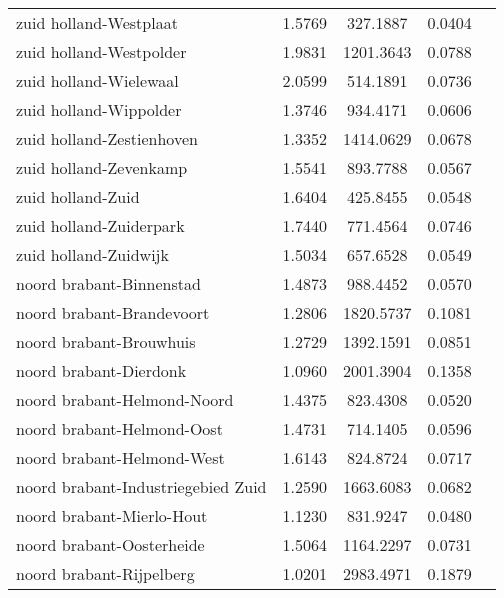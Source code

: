 \begin{longtable}{llccc}
	zuid holland-Westplaat                    & 1.5769  & 327.1887  & 0.0404                 \\
	zuid holland-Westpolder                   & 1.9831  & 1201.3643 & 0.0788                 \\
	zuid holland-Wielewaal                    & 2.0599  & 514.1891  & 0.0736                 \\
	zuid holland-Wippolder                    & 1.3746  & 934.4171  & 0.0606                 \\
	zuid holland-Zestienhoven                 & 1.3352  & 1414.0629 & 0.0678                 \\
	zuid holland-Zevenkamp                    & 1.5541  & 893.7788  & 0.0567                 \\
	zuid holland-Zuid                         & 1.6404  & 425.8455  & 0.0548                 \\
	zuid holland-Zuiderpark                   & 1.7440  & 771.4564  & 0.0746                 \\
	zuid holland-Zuidwijk                     & 1.5034  & 657.6528  & 0.0549                 \\
	noord brabant-Binnenstad                  & 1.4873  & 988.4452  & 0.0570                 \\
	noord brabant-Brandevoort                 & 1.2806  & 1820.5737 & 0.1081                 \\
	noord brabant-Brouwhuis                   & 1.2729  & 1392.1591 & 0.0851                 \\
	noord brabant-Dierdonk                    & 1.0960  & 2001.3904 & 0.1358                 \\
	noord brabant-Helmond-Noord               & 1.4375  & 823.4308  & 0.0520                 \\
	noord brabant-Helmond-Oost                & 1.4731  & 714.1405  & 0.0596                 \\
	noord brabant-Helmond-West                & 1.6143  & 824.8724  & 0.0717                 \\
	noord brabant-Industriegebied Zuid        & 1.2590  & 1663.6083 & 0.0682                 \\
	noord brabant-Mierlo-Hout                 & 1.1230  & 831.9247  & 0.0480                 \\
	noord brabant-Oosterheide                 & 1.5064  & 1164.2297 & 0.0731                 \\
	noord brabant-Rijpelberg                  & 1.0201  & 2983.4971 & 0.1879                 \\

\end{longtable}
